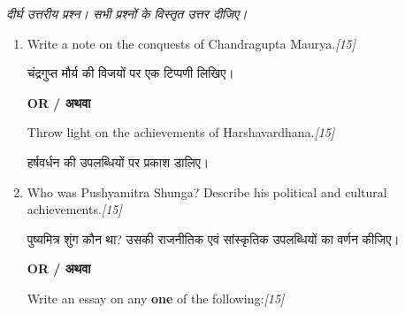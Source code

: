 \documentclass[11pt,a4paper]{article}
\newcommand{\pts}[1]{\hfill \textit{[#1]}}
\begin{document}
\noindent \textit{दीर्घ उत्तरीय प्रश्न। सभी प्रश्नों के विस्तृत उत्तर दीजिए।}

\begin{enumerate}[label=\textbf{\arabic*.},leftmargin=*,start=5,itemsep=14pt]

  \item Write a note on the conquests of Chandragupta Maurya.\pts{15}
  
  चंद्रगुप्त मौर्य की विजयों पर एक टिप्पणी लिखिए।

  \begin{center}\textbf{OR / अथवा}\end{center}

  Throw light on the achievements of Harshavardhana.\pts{15}
  
  हर्षवर्धन की उपलब्धियों पर प्रकाश डालिए।

  \item Who was Pushyamitra Shunga? Describe his political and cultural achievements.\pts{15}
  
  पुष्यमित्र शुंग कौन था? उसकी राजनीतिक एवं सांस्कृतिक उपलब्धियों का वर्णन कीजिए।

  \begin{center}\textbf{OR / अथवा}\end{center}

  Write an essay on any \textbf{one} of the following:\pts{15}

\end{enumerate}
\end{document}
